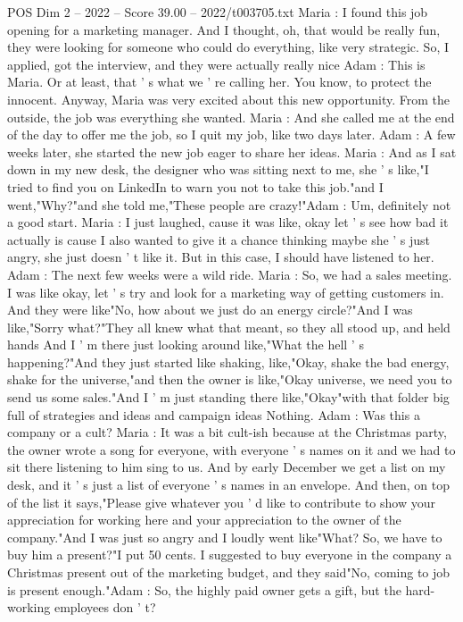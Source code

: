 \begin{textsample}{POS Dim 2 – 2022 – Score 39.00 – 2022/t003705.txt}  \label{ex:f2_pos_031}
Maria : I found this job opening for a marketing manager.
And I thought, oh, that would be really fun, they were looking for someone who could do everything, like very strategic.
So, I applied, got the interview, and they were actually really nice Adam : This is Maria.
Or at least, that ' s what we ' re calling her.
You know, to protect the innocent.
Anyway, Maria was very excited about this new opportunity.
From the outside, the job was everything she wanted.
Maria : And she called me at the end of the day to offer me the job, so I quit my job, like two days later.
Adam : A few weeks later, she started the new job eager to share her ideas.
Maria : And as I sat down in my new desk, the designer who was sitting next to me, she ' s like,"I tried to find you on LinkedIn to warn you not to take this job."and I went,"Why?"and she told me,"These people are crazy!"Adam : Um, definitely not a good start.
Maria : I just laughed, cause it was like, okay let ' s see how bad it actually is cause I also wanted to give it a chance thinking maybe she ' s just angry, she just doesn ' t like it.
But in this case, I should have listened to her.
Adam : The next few weeks were a wild ride.
Maria : So, we had a sales meeting.
I was like okay, let ' s try and look for a marketing way of getting customers in.
And they were like"No, how about we just do an energy circle?"And I was like,"Sorry what?"They all knew what that meant, so they all stood up, and held hands And I ' m there just looking around like,"What the hell ' s happening?"And they just started like shaking, like,"Okay, shake the bad energy, shake for the universe,"and then the owner is like,"Okay universe, we need you to send us some sales."And I ' m just standing there like,"Okay"with that folder big full of strategies and ideas and campaign ideas Nothing.
Adam : Was this a company or a cult?
Maria : It was a bit cult-ish because at the Christmas party, the owner wrote a song for everyone, with everyone ' s names on it and we had to sit there listening to him sing to us.
And by early December we get a list on my desk, and it ' s just a list of everyone ' s names in an envelope.
And then, on top of the list it says,"Please give whatever you ' d like to contribute to show your appreciation for working here and your appreciation to the owner of the company."And I was just so angry and I loudly went like"What?
So, we have to buy him a present?"I put 50 cents.
I suggested to buy everyone in the company a Christmas present out of the marketing budget, and they said"No, coming to job is present enough."Adam : So, the highly paid owner gets a gift, but the hard-working employees don ' t?

\end{textsample}
